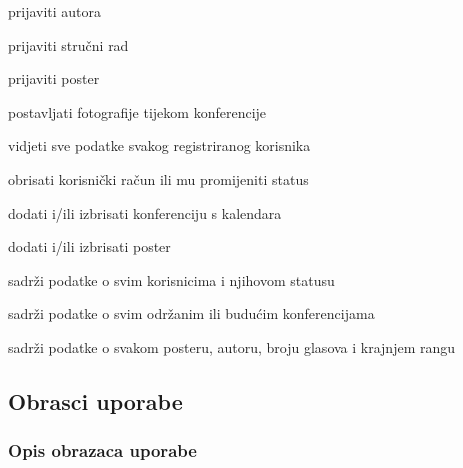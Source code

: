 \begin{packed_enum}
				\begin{packed_enum}
					
					\item prijaviti autora
					\item prijaviti stručni rad
					\item prijaviti poster
					\item postavljati fotografije tijekom konferencije
					
				\end{packed_enum}

				\item  {}
				
				\begin{packed_enum}
					
					\item vidjeti sve podatke svakog registriranog korisnika
					\item obrisati korisnički račun ili mu promijeniti status
					\item dodati i/ili izbrisati konferenciju s kalendara
					\item dodati i/ili izbrisati poster
					
				\end{packed_enum}

			
				\item  {}
				
				\begin{packed_enum}
					
					\item sadrži podatke o svim korisnicima i njihovom statusu
					\item sadrži podatke o svim održanim ili budućim konferencijama
					\item sadrži podatke o svakom posteru, autoru, broju glasova i krajnjem rangu
					
				\end{packed_enum}
			\end{packed_enum}
			
			\eject 
			
			
				
			\subsection{Obrasci uporabe}
				
				\subsubsection{Opis obrazaca uporabe}
					
